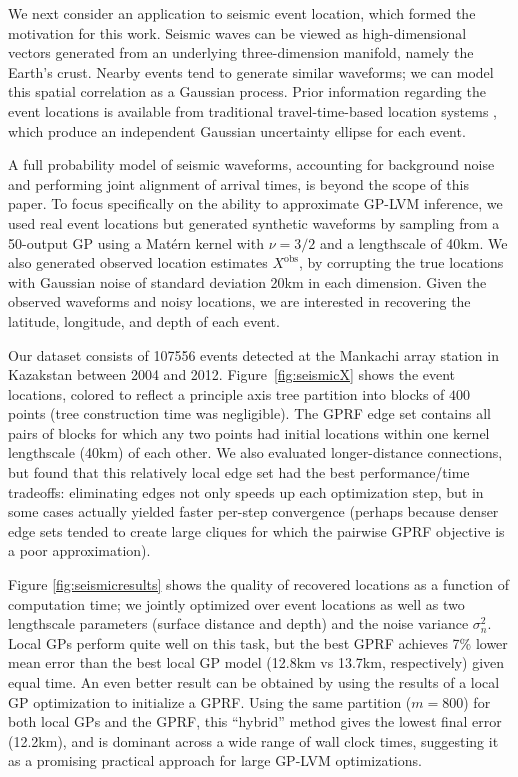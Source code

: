 \documentclass{article}
\begin{document}
We next consider an application to seismic event location, which formed the
motivation for this work. Seismic waves can be
viewed as high-dimensional vectors generated from an
underlying three-dimension manifold, namely the Earth's
crust. Nearby events tend to generate similar waveforms; we
can model this spatial correlation as a Gaussian process. Prior information regarding the event
locations is available from traditional travel-time-based location systems
\cite{ISCcitation2015}, which produce an independent Gaussian uncertainty ellipse for each event.

A full probability model of seismic waveforms, accounting for background
noise and performing joint alignment of arrival times, is beyond the scope of this
paper. To focus specifically on the ability to approximate GP-LVM inference, we
used real event locations but generated synthetic waveforms  by sampling from a 50-output GP using a Mat\'ern kernel
\cite{rasmussen2006} with $\nu=3/2$ and a lengthscale of 40km. We also
generated observed location estimates $X^\text{obs}$, by corrupting the
true locations with Gaussian noise of standard deviation
20km in each dimension. Given the
observed waveforms and noisy locations, we are interested in recovering the
latitude, longitude, and depth of each event.

Our dataset consists of 107556 events detected at the Mankachi array
station in Kazakstan between 2004 and 2012. Figure~\ref{fig:seismicX}
shows the event locations, colored to reflect a principle axis tree
partition \cite{mcnames2001fast} into blocks of $400$ points (tree
construction time was negligible). The GPRF edge set contains all pairs of
blocks for which any two points had initial locations within one
kernel lengthscale (40km) of each other. We also evaluated
longer-distance connections, but found that this relatively local
edge set had the best performance/time tradeoffs: eliminating edges not
only speeds up each optimization step, but in some cases actually
yielded faster per-step convergence (perhaps because denser edge sets
tended to create large cliques for which the pairwise GPRF objective is
a poor approximation).

Figure \ref{fig:seismicresults} shows the quality of recovered locations as a
function of computation time; we jointly optimized over event locations as
well as two lengthscale parameters (surface distance
and depth) and the noise variance $\sigma^2_n$. Local GPs 
perform quite well on this task, but the best
GPRF achieves 7\% lower mean error than the best local
GP model (12.8km vs 13.7km, respectively) given equal time. An even
better result can be obtained by using the results of a local GP
optimization to initialize a GPRF. Using the same
partition ($m=800$) for both local GPs and the GPRF, this ``hybrid'' method
gives the lowest final error (12.2km), and is dominant across a wide
range of wall clock times, suggesting it as a promising
practical approach for large GP-LVM optimizations. 
 
\end{document}
